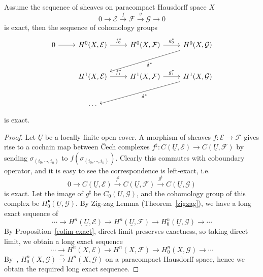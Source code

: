 \begin{thm}\label{exact cohomology groups}
    Assume the sequence of sheaves on paracompact Hausdorff space $X$
    \[0\to\mathcal{E}\xrightarrow{f}\mathcal{F}\xrightarrow{g}\mathcal{G}\to 0\]
    is exact, then the sequence of cohomology groups
    \[\begin{tikzcd}
        0 \ar[r] & H^0(X,\mathcal{E}) \ar[r, "f_0^*"] & H^0(X,\mathcal{F}) \ar[r, "g_0^*"] & H^0(X,\mathcal{G}) \ar[dll, "\delta^*"] \\[3mm]
        {} & H^1(X,\mathcal{E}) \ar[r, "f_1^*"] & H^1(X,\mathcal{F}) \ar[r, "g_1^*"] & H^1(X,\mathcal{G}) \ar[dll, "\delta^*"] \\[3mm]
        {} & \cdots & {} & {}
    \end{tikzcd}\]
    is exact.
\end{thm}
\begin{proof}
    Let $\underline{U}$ be a locally finite open cover.
    A morphism of sheaves $f:\mathcal{E}\to\mathcal{F}$ gives rise to a cochain map between \v{C}ech complexes $f^\sharp:C(\underline{U},\mathcal{E})\to C(\underline{U},\mathcal{F})$ by sending $\sigma_{(i_0,\cdots,i_n)}$ to $f(\sigma_{(i_0,\cdots,i_n)})$.
    Clearly this commutes with coboundary operator, and it is easy to see the correspondence is left-exact, i.e.\
    \[0\to C(\underline{U},\mathcal{E})\xrightarrow{f^\sharp}C(\underline{U},\mathcal{F})\xrightarrow{g^\sharp}C(\underline{U},\mathcal{G})\]
    is exact.
    Let the image of $g^\sharp$ be $C_0(\underline{U},\mathcal{G})$, and the cohomology group of this complex be $H^\bullet_0(\underline{U},\mathcal{G})$.
    By Zig-zag Lemma (Theorem~\ref{zigzag}), we have a long exact sequence of
    \[\cdots\to H^n(\underline{U},\mathcal{E})\to H^n(\underline{U},\mathcal{F})\to H^n_0(\underline{U},\mathcal{G})\to\cdots\]
    By Proposition~\ref{colim exact}, direct limit preserves exactness, so taking direct limit, we obtain a long exact sequence
    \[\cdots\to H^n(X,\mathcal{E})\to H^n(X,\mathcal{F})\to H^n_0(X,\mathcal{G})\to\cdots\]
    By~\cite[25.\ Proposition 7]{FAC}, $H^n_0(X,\mathcal{G})\xrightarrow{\sim}H^n(X,\mathcal{G})$ on a paracompact Hausdorff space, hence we obtain the required long exact sequence.
\end{proof}

